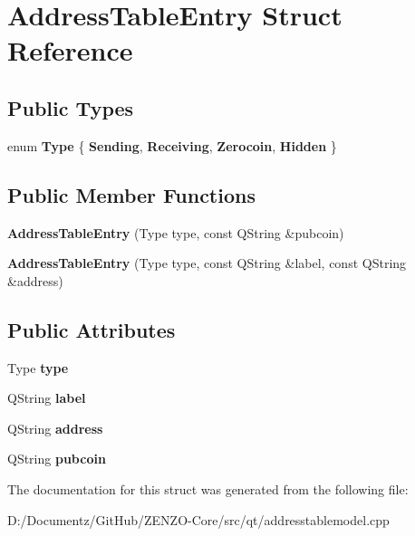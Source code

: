 \hypertarget{struct_address_table_entry}{}\section{Address\+Table\+Entry Struct Reference}
\label{struct_address_table_entry}
\subsection*{Public Types}
\begin{DoxyCompactItemize}
\item 
\mbox{\label{struct_address_table_entry_afe73719f8e77468e712ed9006f437639}} 
enum {\bfseries Type} \{ {\bfseries Sending}, 
{\bfseries Receiving}, 
{\bfseries Zerocoin}, 
{\bfseries Hidden}
 \}
\end{DoxyCompactItemize}
\subsection*{Public Member Functions}
\begin{DoxyCompactItemize}
\item 
\mbox{\label{struct_address_table_entry_aef5443951ad7fbfd01493a3443f09e20}} 
{\bfseries Address\+Table\+Entry} (Type type, const Q\+String \&pubcoin)
\item 
\mbox{\label{struct_address_table_entry_a49b13433cb41b3af9ceb83a535fc2ea5}} 
{\bfseries Address\+Table\+Entry} (Type type, const Q\+String \&label, const Q\+String \&address)
\end{DoxyCompactItemize}
\subsection*{Public Attributes}
\begin{DoxyCompactItemize}
\item 
\mbox{\label{struct_address_table_entry_a2e782e5239a5adae62eaa81746f55314}} 
Type {\bfseries type}
\item 
\mbox{\label{struct_address_table_entry_a4a427495652b7716f84aa88b2cb4f296}} 
Q\+String {\bfseries label}
\item 
\mbox{\label{struct_address_table_entry_ae36a700ca64a079d26f8aedce1ad9155}} 
Q\+String {\bfseries address}
\item 
\mbox{\label{struct_address_table_entry_a4853d255deca7286e7454fcd09b41ea3}} 
Q\+String {\bfseries pubcoin}
\end{DoxyCompactItemize}


The documentation for this struct was generated from the following file\+:\begin{DoxyCompactItemize}
\item 
D\+:/\+Documentz/\+Git\+Hub/\+Z\+E\+N\+Z\+O-\/\+Core/src/qt/addresstablemodel.\+cpp\end{DoxyCompactItemize}
